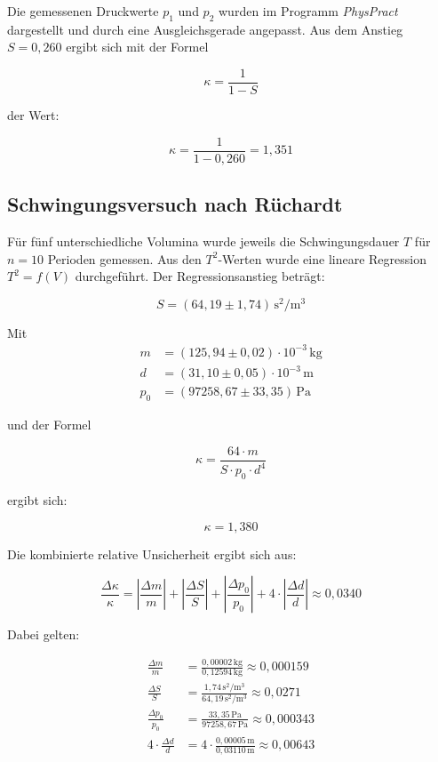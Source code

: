 \documentclass{protokoll}
\begin{document}
Die gemessenen Druckwerte $p_1$ und $p_2$ wurden im Programm \textit{PhysPract} 
dargestellt und durch eine Ausgleichsgerade angepasst. Aus dem 
Anstieg $S = 0{,}260$ ergibt sich mit der Formel

$$
\kappa = \frac{1}{1 - S}
$$

der Wert:

$$
\kappa = \frac{1}{1 - 0{,}260} = 1{,}351
$$



\subsection{Schwingungsversuch nach Rüchardt}

Für fünf unterschiedliche Volumina wurde jeweils die Schwingungsdauer 
$T$ für $n = 10$ Perioden gemessen. Aus den $T^2$-Werten wurde eine lineare 
Regression $T^2 = f(V)$ durchgeführt. Der Regressionsanstieg beträgt:

$$
S = (64{,}19 \pm 1{,}74) \, \mathrm{s^2/m^3}
$$

Mit
\begin{align*}
m &= (125{,}94 \pm 0{,}02) \cdot 10^{-3} \, \mathrm{kg} \\
d &= (31{,}10 \pm 0{,}05) \cdot 10^{-3} \, \mathrm{m} \\
p_0 &= (97258{,}67 \pm 33{,}35) \, \mathrm{Pa}
\end{align*}

und der Formel

$$
\kappa = \frac{64 \cdot m}{S \cdot p_0 \cdot d^4}
$$

ergibt sich:

$$
\kappa = 1{,}380
$$

Die kombinierte relative Unsicherheit ergibt sich aus:

$$
\frac{\Delta \kappa}{\kappa} = \left| \frac{\Delta m}{m} \right| + 
\left| \frac{\Delta S}{S} \right| + \left| \frac{\Delta p_0}{p_0} \right| + 
4 \cdot \left| \frac{\Delta d}{d} \right| \approx 0{,}0340
$$

Dabei gelten:

\begin{align*}
\frac{\Delta m}{m} &= \frac{0{,}00002 \, \mathrm{kg}}{0{,}12594 \, \mathrm{kg}} \approx 0{,}000159 \\
\frac{\Delta S}{S} &= \frac{1{,}74 \, \mathrm{s^2/m^3}}{64{,}19 \, \mathrm{s^2/m^3}} \approx 0{,}0271 \\
\frac{\Delta p_0}{p_0} &= \frac{33{,}35 \, \mathrm{Pa}}{97258{,}67 \, \mathrm{Pa}} \approx 0{,}000343 \\
4 \cdot \frac{\Delta d}{d} &= 4 \cdot \frac{0{,}00005 \, \mathrm{m}}{0{,}03110 \, \mathrm{m}} \approx 0{,}00643
\end{align*}
\end{document}
